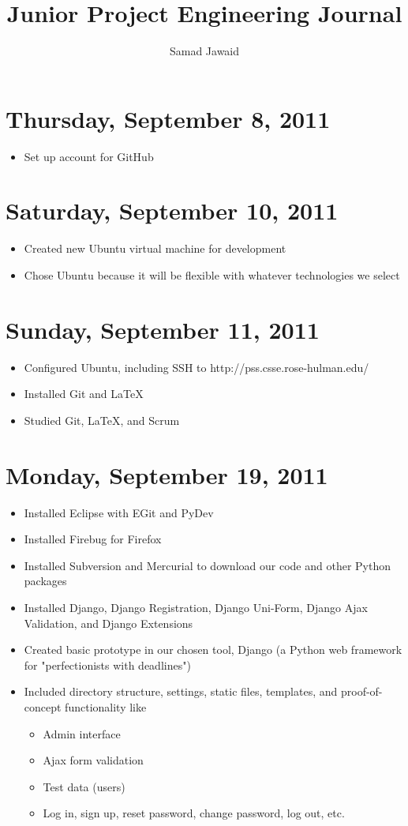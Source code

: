 \documentclass{article}
\title{Junior Project Engineering Journal}
\author{Samad Jawaid}
\begin{document}
\maketitle

\section{Thursday, September 8, 2011}
\begin{itemize}
\item Set up account for GitHub
\end{itemize}

\section{Saturday, September 10, 2011}
\begin{itemize}
\item Created new Ubuntu virtual machine for development
\item Chose Ubuntu because it will be flexible with whatever technologies we select
\end{itemize}

\section{Sunday, September 11, 2011}
\begin{itemize}
\item Configured Ubuntu, including SSH to http://pss.csse.rose-hulman.edu/
\item Installed Git and \LaTeX
\item Studied Git, \LaTeX, and Scrum
\end{itemize}

\section{Monday, September 19, 2011}
\begin{itemize}
\item Installed Eclipse with EGit and PyDev
\item Installed Firebug for Firefox
\item Installed Subversion and Mercurial to download our code and other Python packages
\item Installed Django, Django Registration, Django Uni-Form, Django Ajax Validation, and Django Extensions
\item Created basic prototype in our chosen tool, Django (a Python web framework for "perfectionists with deadlines")
\item Included directory structure, settings, static files, templates, and proof-of-concept functionality like
    \begin{itemize}
    \item Admin interface
    \item Ajax form validation
    \item Test data (users)
    \item Log in, sign up, reset password, change password, log out, etc.
    \end{itemize}
\end{itemize}
\end{document}

